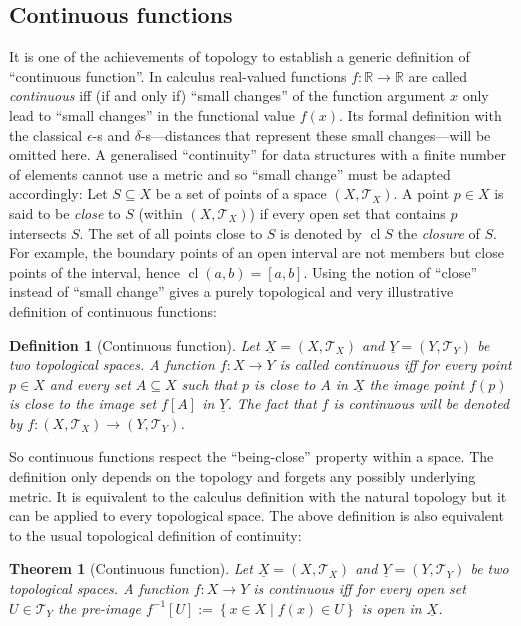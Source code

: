 \documentclass[5p]{elsarticle}
\newtheorem{dfn}{Definition}
\newtheorem{theorem}{Theorem}
\newcommand{\mathpset}[2]{\left\{#1\mid #2\right\}}
\newcommand{\qq}[1]{``#1''}
\DeclareMathOperator{\closure}{cl}
\begin{document}
\subsection{Continuous functions}
It is one of the achievements of topology to establish a 
ge\-ne\-ric definition of 
\qq{continuous function}. 
In calculus real-valued functions $f:\mathbb{R}\to\mathbb{R}$ are called \emph{continuous} 
iff (if and only if) \qq{small changes} of the function argument $x$ only lead to 
\qq{small changes} in the functional value $f(x)$. Its formal definition with the classical 
$\epsilon$-s and $\delta$-s---distances that represent these small changes---will be omitted 
here. 
A generalised \qq{continuity} for data structures with a finite number of 
elements cannot use a metric and so \qq{small change} must be adapted accordingly:
Let $S\subseteq X$ be a set of points of a space $(X,\mathcal{T}_X)$. 
A point $p\in X$ is said to be \emph{close} to $S$ (within $(X,\mathcal{T}_X)$) if every open 
set that contains $p$ intersects $S$. 
The set of all points close to $S$ is denoted by $\closure S$ the 
\emph{closure} of $S$. For example, the boundary points of an open interval are not 
members but close points of the interval, hence $\closure (a,b) = [a,b]$. 
Using the notion of \qq{close} instead of \qq{small change} gives a purely topological and 
very illustrative definition of continuous functions:

\begin{dfn}[Continuous function]
Let $\underline{X}=(X,\mathcal{T}_X)$ and $\underline{Y}= (Y,\mathcal{T}_Y)$ be two 
topological spaces. 
A function $f:X\to Y$ is called \emph{continuous} iff for every point $p\in X$ and every set 
$A\subseteq X$ such that $p$ is close to $A$ in $\underline{X}$ the image point $f(p)$ is close 
to the image set $f[A]$ in $\underline{Y}$. 
The fact that $f$ is continuous will be denoted by $f:(X,\mathcal{T}_X)\to(Y,\mathcal{T}_Y)$.
\end{dfn}

So continuous functions respect the \qq{being-close} property within a space. The definition 
only depends on the topology and forgets any possibly underlying metric. 
It is equivalent to the calculus definition with the natural topology but it can be applied 
to every topological space. The above definition is also equivalent to the usual topological 
definition of continuity:

\begin{theorem}[Continuous function]
Let $\underline{X}=(X,\mathcal{T}_X)$ and $\underline{Y}= (Y,\mathcal{T}_Y)$ be two 
topological spaces. 
A function $f:X\to Y$ is \emph{continuous} iff for every open set $U\in\mathcal{T}_Y$ 
the pre-image $f^{-1}[U]:=\mathpset{x\in X}{f(x)\in U}$ is open in $\underline{X}$.
\end{theorem}
\end{document}
